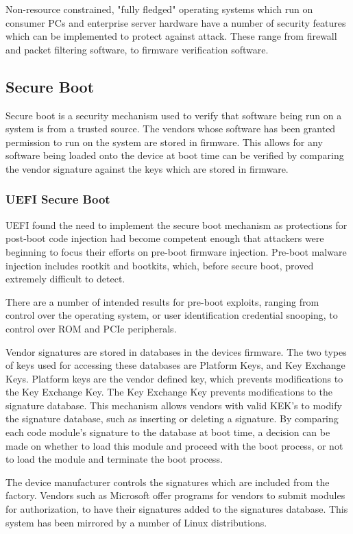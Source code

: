 Non-resource constrained, "fully fledged" operating systems which run on
consumer PCs and enterprise server hardware have a number of security features
which can be implemented to protect against attack. These range from firewall
and packet filtering software, to firmware verification software.

\subsection{Secure Boot}

Secure boot is a security mechanism used to verify that software being run on a
system is from a trusted source. The vendors whose software has been granted
permission to run on the system are stored in firmware\cite{ubuntuSecureBoot}.
This allows for any software being loaded onto the device at boot time can be
verified by comparing the vendor signature against the keys which are stored in
firmware.

\subsubsection{UEFI Secure Boot}

UEFI found the need to implement the secure boot mechanism as protections for
post-boot code injection had become competent enough that attackers were
beginning to focus their efforts on pre-boot firmware injection. Pre-boot
malware injection includes rootkit and bootkits, which, before secure boot,
proved extremely difficult to detect.

There are a number of intended results for pre-boot exploits, ranging from
control over the operating system, or user identification credential snooping,
to control over ROM and PCIe peripherals.

Vendor signatures are stored in databases in the devices firmware. The two types
of keys used for accessing these databases are Platform Keys, and Key Exchange
Keys\cite{uefiSecureBoot}. Platform keys are the vendor defined key, which
prevents modifications to the Key Exchange Key. The Key Exchange Key
prevents modifications to the signature database. This mechanism allows vendors
with valid KEK's to modify the signature database, such as inserting or deleting
a signature. By comparing each code module's signature to the database at boot
time, a decision can be made on whether to load this module and proceed with the
boot process, or not to load the module and terminate the boot process.

The device manufacturer controls the signatures which are included from the
factory. Vendors such as Microsoft offer programs for vendors to submit modules
for authorization, to have their signatures added to the signatures database.
This system has been mirrored by a number of Linux distributions.

